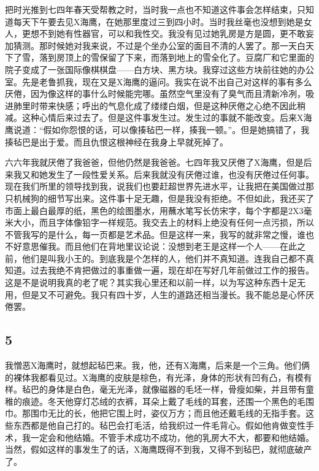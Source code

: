 把时光推到七四年春天受帮教之时，当时我一点也不知道这件事会怎样结束，只知道每天下午要去见X海鹰，在她那里度过三到四小时。当时我丝毫也没想到她是女人，更想不到她有性器官，可以和我性交。我没有见过她乳房是方是圆，更不敢妄加猜测。那时候她对我来说，不过是个坐办公室的面目不清的人罢了。那一天白天下了雪，落到房顶上的雪保留了下来，而落到地上的雪全化了。豆腐厂和它里面的院子变成了一张国际像棋棋盘——白方块、黑方块。我穿过这些方块前往她的办公室。先是老鲁抓我，现在又是X海鹰的逼问。我实在说不出自己对这样的事有多么厌倦，因为像这样的事什么时候能完哪。虽然空气里没有了臭气而且清新冷冽，吸进肺里时带来快感；呼出的气息化成了缕缕白烟，但是这种厌倦之心绝不因此稍减。这种心情后来过去了。但是这件事发生过。发生过的事就不能改变。后来X海鹰说道：“假如你怨恨的话，可以像揍毡巴一样，揍我一顿。”。但是她搞错了，我揍毡巴是出于爱。而且仇恨这根神经在我身上早就死掉了。 

六六年我就厌倦了我爸爸，但他仍然是我爸爸。七四年我又厌倦了X海鹰，但是后来我又和她发生了一段性爱关系。后来我就没有厌倦过谁，也没有厌倦过任何事。现在我们所里的领导找到我，说我们也要赶超世界先进水平，让我把在美国做过那只机械狗的细节写出来。这件事十足无趣，但是我没有拒绝。不但如此，我还买了市面上最白最厚的纸，黑色的绘图墨水，用蘸水笔写长仿宋字，每个字都是2X3毫米大小，而且字体像铅字一样规范。我交去上的材料上绝没有任何一点污损，所以不管我写的是什么，每一页都是艺术品。但是这样一来，我写的就非常之慢，谁也不好意思催我。而且他们在背地里议论说：没想到老王是这样一个人——在此之前，他们是叫我小王的。到底我是个怎样的人，他们并不真知道。连我自己都不真知道。过去我绝不肯把做过的事重做一遍，现在却在写好几年前做过工作的报告。这是不是说明我真的老了呢？其实我心里还和以前一样，以为写这种东西十足无用，但是又不可避免。我只有四十岁，人生的道路还相当漫长。我不能总是心怀厌倦罢。 

\subsection{5} 

我憎恶X海鹰时，就想起毡巴来。我，他，还有X海鹰，后来是一个三角。他们俩的裸体我都看见过。X海鹰的皮肤是棕色，有光泽，身体的形状有凹有凸，有模有样。毡巴的身体是白色，毫无光泽，就像磁器的毛坯一样，骨瘦如柴，并且带有童稚的痕迹。冬天他穿灯芯绒的衣裤，耳朵上戴了毛线的耳套，还围一个黑色的毛围巾。那围巾无比的长，他把它围上时，姿仪万方；而且他还戴毛线的无指手套。这些东西都是他自己打的。毡巴会打毛活，给我织过一件毛背心。假如他肯做变性手术，我一定会和他结婚。不管手术成功不成功，他的乳房大不大，都要和他结婚。当然，假如这样的事发生了的话，X海鹰既得不到我，又得不到毡巴，就彻底破产了。 

